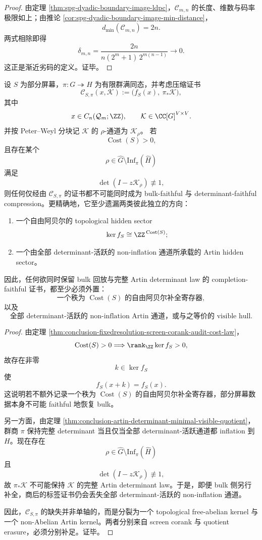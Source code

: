 \begin{proof}
由定理 \ref{thm:spg-dyadic-boundary-image-ldpc}，\(\mathcal C_{m,n}\) 的长度、维数与码率极限如上；由推论 \ref{cor:spg-dyadic-boundary-image-min-distance}，
\[
d_{\min}(\mathcal C_{m,n})=2n.
\]
两式相除即得
\[
\delta_{m,n}
=
\frac{2n}{n(2^m+1)\,2^{m(n-1)}}
\to 0.
\]
这正是渐近劣码的定义。证毕。
\end{proof}



\begin{theorem}\label{thm:conclusion-fixedresolution-screen-artin-dual-obstruction}
设 \(S\) 为部分屏幕，\(\pi:G\twoheadrightarrow H\) 为有限群满同态，并考虑压缩证书
\[
\mathcal C_{S,\pi}(x,\mathcal K)
:=
\bigl(f_S(x),\ \pi_\ast\mathcal K\bigr),
\]
其中
\[
x\in C_n(\mathcal Q_m;\ZZ),
\qquad
\mathcal K\in \CC[G]^{V\times V}.
\]
并按 Peter--Weyl 分块记 \(\mathcal K\) 的 \(\rho\)-通道为 \(\mathcal K_\rho\)。
若
\[
\operatorname{Cost}(S)>0,
\]
且存在某个
\[
\rho\in \widehat G\setminus \mathrm{Inf}_\pi(\widehat H)
\]
满足
\[
\det(I-z\mathcal K_\rho)\not\equiv 1,
\]
则任何仅经由 \(\mathcal C_{S,\pi}\) 的证书都不可能同时成为 bulk-faithful 与 determinant-faithful compression。更精确地，它至少遗漏两类彼此独立的方向：
\begin{enumerate}
  \item 一个自由阿贝尔的 topological hidden sector
        \[
        \ker f_S\cong \ZZ^{\,\operatorname{Cost}(S)};
        \]
  \item 一个由全部 determinant-活跃的 non-inflation 通道所承载的 Artin hidden sector。
\end{enumerate}
因此，任何欲同时保留 bulk 回放与完整 Artin determinant law 的 completion-faithful 证书，都至少必须外置：
\[
\text{一个秩为 }\operatorname{Cost}(S)\text{ 的自由阿贝尔补全寄存器},
\]
以及
\[
\text{全部 determinant-活跃的 non-inflation Artin 通道，或与之等价的 visible hull}.
\]
\end{theorem}

\begin{proof}
由定理 \ref{thm:conclusion-fixedresolution-screen-corank-audit-cost-law}，
\[
\operatorname{Cost}(S)>0
\Longrightarrow
\rank_\ZZ\ker f_S>0,
\]
故存在非零
\[
k\in\ker f_S
\]
使
\[
f_S(x+k)=f_S(x).
\]
这说明若不额外记录一个秩为 \(\operatorname{Cost}(S)\) 的自由阿贝尔补全寄存器，部分屏幕数据本身不可能 faithful 地恢复 bulk。

另一方面，由定理 \ref{thm:conclusion-artin-determinant-minimal-visible-quotient}，群商 \(\pi\) 保持完整 determinant 当且仅当全部 determinant-活跃通道都 inflation 到 \(H\)。现在存在
\[
\rho\in \widehat G\setminus \mathrm{Inf}_\pi(\widehat H)
\]
且
\[
\det(I-z\mathcal K_\rho)\not\equiv 1,
\]
故 \(\pi_\ast\mathcal K\) 不可能保持 \(\mathcal K\) 的完整 Artin determinant law。于是，即便 bulk 侧另行补全，商后的标签证书仍会丢失全部 determinant-活跃的 non-inflation 通道。

因此，\(\mathcal C_{S,\pi}\) 的缺失并非单轴的，而是分裂为一个 topological free-abelian kernel 与一个 non-Abelian Artin kernel。两者分别来自 screen corank 与 quotient erasure，必须分别补足。证毕。
\end{proof}

